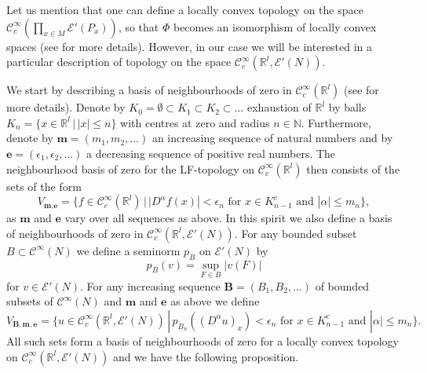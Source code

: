 \documentclass[a4paper]{amsart}
\newcommand{\RR}{\mathbb{R}}
\newcommand{\NN}{\mathbb{N}}
\newcommand{\cE}{\mathcal{E}}
\newcommand{\C}{\mathord{\mathcal{C}^{\infty}}}
\newcommand{\Cc}{\mathord{\mathcal{C}^{\infty}_{c}}}
\begin{document}
Let us mention that one can define a locally convex topology on the space $\Cc(\prod_{x\in M}\cE'(P_{x}))$, so that $\Phi$ becomes an isomorphism
of locally convex spaces (see \cite{LeMaVa17} for more details). However, in our case we will be interested 
in a particular description of topology on the space $\Cc(\RR^{l},\cE'(N))$.

We start by describing a basis of neighbourhoods of zero in $\Cc(\RR^{l})$ (see \cite{Hor67} for more details). 
Denote by $K_{0}=\emptyset\subset K_{1}\subset K_{2}\subset\ldots$ exhaustion of $\RR^{l}$ by balls $K_{n}=\{x\in\RR^{l}\,|\,|x|\leq n\}$ 
with centres at zero and radius $n\in\NN$. Furthermore, denote by $\textbf{m}=(m_{1},m_{2},\ldots)$
an increasing sequence of natural numbers and by $\textbf{e}=(\epsilon_{1},\epsilon_{2},\ldots)$ a decreasing
sequence of positive real numbers. The neighbourhood basis of zero for the LF-topology on $\Cc(\RR^{l})$
then consists of the sets of the form
\[
V_{\textbf{m},\textbf{e}}=\{f\in\Cc(\RR^{l})\,|\,|D^{\alpha}f(x)|<\epsilon_{n}\text{ for }x\in K_{n-1}^{c}\text{ and }|\alpha|\leq m_{n}\},
\]
as $\textbf{m}$ and $\textbf{e}$ vary over all sequences as above. In this spirit we also define a basis of neighbourhoods
of zero in $\Cc(\RR^{l},\cE'(N))$. For any bounded subset $B\subset\C(N)$ we define a seminorm $p_{B}$ on $\cE'(N)$ by 
\[
p_{B}(v)=\sup_{F\in B}|v(F)|
\] 
for $v\in\cE'(N)$. For any increasing sequence $\textbf{B}=(B_{1},B_{2},\ldots)$ of bounded subsets of $\C(N)$ and 
$\textbf{m}$ and $\textbf{e}$ as above we define
\[
V_{\textbf{B},\textbf{m},\textbf{e}}=\{u\in\Cc(\RR^{l},\cE'(N))\,|\,
p_{B_{n}}((D^{\alpha}u)_{x})<\epsilon_{n}\text{ for }x\in K_{n-1}^{c}\text{ and }|\alpha|\leq m_{n}\}.
\]
All such sets form a basis of neighbourhoods of zero for a locally convex topology on $\Cc(\RR^{l},\cE'(N))$ and we have
the following proposition.
\end{document}
